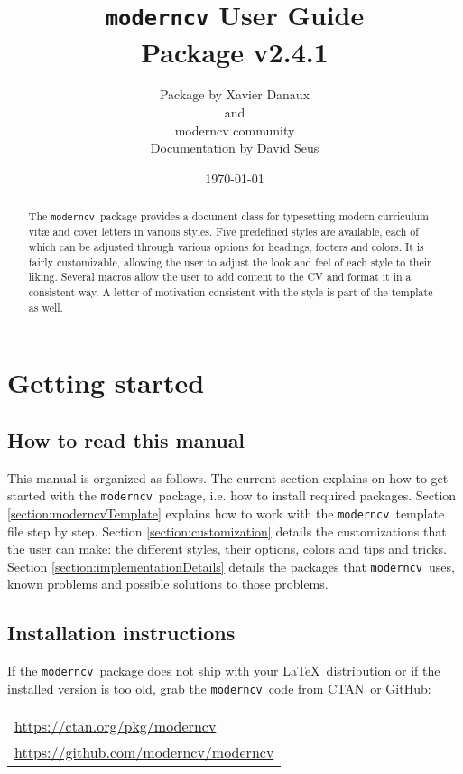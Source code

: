 \documentclass[a4paper, 11pt]{article}
\title{%
  \texttt{moderncv} User Guide\\
  {\small Package v2.4.1}%
}
\author{%
  Package by Xavier Danaux\\
  and\\
  moderncv community\\
  {\small Documentation by David Seus}%
}
\date{\today}
\newcommand{\code}[1]{\lstinline!#1!}
\newcommand{\moderncv}{\code{moderncv}}
\newcommand{\Moderncv}{\moderncv~}
\newcommand{\github}{GitHub}
\newcommand{\ctan}{CTAN}
\newcommand{\Ctan}{\ctan~}
\newcommand{\Latex}{\LaTeX~}
\newcommand{\moderncvGithub}{\url{https://github.com/moderncv/moderncv}}
\newcommand{\moderncvCtan}{\url{https://ctan.org/pkg/moderncv}}
\begin{document}
\maketitle
\begin{abstract}
  \noindent
  The \Moderncv package provides a document class for typesetting modern curriculum vit\ae{} and cover letters in various styles.
  Five predefined styles are available, each of which can be adjusted through various options for headings, footers and colors.
  It is fairly customizable, allowing the user to adjust the look and feel of each style to their liking.
  Several macros allow the user to add content to the CV and format it in a consistent way.
  A letter of motivation consistent with the style is part of the template as well.
\end{abstract}
\tableofcontents



\section{Getting started}
\subsection{How to read this manual}
This manual is organized as follows.
The current section explains on how to get started with the \Moderncv package, i.e. how to install required packages.
Section \ref{section:moderncvTemplate} explains how to work with the \Moderncv template file step by step.
Section \ref{section:customization} details the customizations that the user can make: the different styles, their options, colors and tips and tricks.
Section \ref{section:implementationDetails} details the packages that \Moderncv uses, known problems and possible solutions to those problems.

\subsection{Installation instructions}
If the \Moderncv package does not ship with your \Latex distribution or if the installed version is too old, grab the \Moderncv code from \Ctan or \github:

\begin{tabular}{l}
  \moderncvCtan \\%
  \moderncvGithub
\end{tabular}
\end{document}
